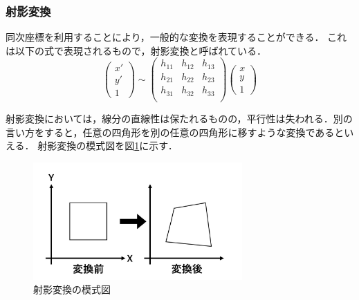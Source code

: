 \documentclass[summary]{nitocs}
\numberwithin{equation}{section}
\begin{document}
            \subsubsection{射影変換}
                同次座標を利用することにより，一般的な変換を表現することができる．
                これは以下の式で表現されるもので，射影変換と呼ばれている\cite{DIP}．
                \begin{equation} %
                    \left(
                        \begin{array}{ccc}
                        x'\\
                        y'\\
                        1
                        \end{array}
                    \right)\sim
                    \left(
                        \begin{array}{ccc}
                        h_{11} & h_{12} & h_{13}\\
                        h_{21} & h_{22} & h_{23}\\
                        h_{31} & h_{32} & h_{33}\\
                        \end{array}
                    \right)
                    \left(
                        \begin{array}{ccc}
                        x\\
                        y\\
                        1
                        \end{array}
                    \right)
                    \label{Homography}
                \end{equation}

                射影変換においては，線分の直線性は保たれるものの，平行性は失われる．別の言い方をすると，任意の四角形を別の任意の四角形に移すような変換であるといえる．
                射影変換の模式図を図\ref{sample_homography}に示す．
                \begin{figure}[tb] %
                    \begin{center}
                    \includegraphics[clip,width=80mm]{Homography.jpg} 
                    \caption{射影変換の模式図}
                    \label{sample_homography}
                    \end{center}
                \end{figure}
\end{document}
